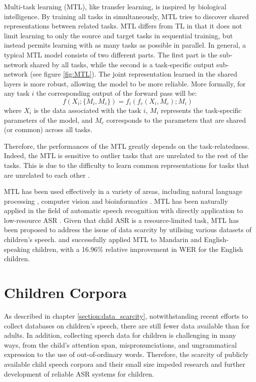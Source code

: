 Multi-task learning (MTL), like transfer learning, is inspired by biological intelligence. By training all tasks in simultaneously, MTL tries to discover shared representations between related tasks. MTL differs from TL in that it does not limit learning to only the source and target tasks in sequential training, but instead permits learning with as many tasks as possible in parallel.  In general, a typical MTL model consists of two different parts. The first part is the sub-network shared by all tasks, while the second is a task-specific output sub-network (see figure \ref{fig:MTL}). The joint representation learned in the shared layers is more robust, allowing the model to be more reliable.  
More formally, for any task $i$ the corresponding output of the forward pass will be:
\begin{equation} \label{equation:MT}
    f(X_i;\{M_i, M_{c}\}) = f_i(f_{c}(X_i,{M_{c}}); {M_i}) 
\end{equation}
where $X_i$ is the data associated with the task $i$, $M_i$ represents the task-specific parameters of the model, and $M_{c}$ corresponds to the parameters that are shared (or common) across all tasks.

Therefore, the performances of the MTL greatly depends on the task-relatedness. Indeed, the MTL is sensitive to outlier tasks that are unrelated to the rest of the tasks. This is due to the difficulty to learn common representations for tasks that are unrelated to each other \cite{zhang2018overview}.

MTL has been used effectively in a variety of areas, including natural language processing \cite{multi-nlp}, computer vision \cite{mtl_computervision} and bioinformatics \cite{bioinfo}. MTL has been naturally applied in the field of automatic speech recognition \cite{MTL-LFMMI} with directly application to low-resource ASR \cite{abad2020}. Given that child ASR is a resource-limited task, MTL has been proposed to address the issue of data scarcity by utilising various datasets of children's speech. 
 \cite{TransferLF} and \cite{2019multi} successfully applied MTL to Mandarin and English-speaking children, with a 16.96\% relative improvement in WER for the English children.


\section{Children Corpora}
\label{section:children_corpora}
As described in chapter \ref{section:data_scarcity}, notwithstanding recent efforts to collect databases on children's speech, there are still fewer data available than for adults. In addition, collecting speech data for children is challenging in many ways, from the child's attention span, mispronunciations, and ungrammatical expression to the use of out-of-ordinary words. Therefore, the scarcity of publicly available child speech corpora and their small size impeded research and further development of reliable ASR systems for children. 


